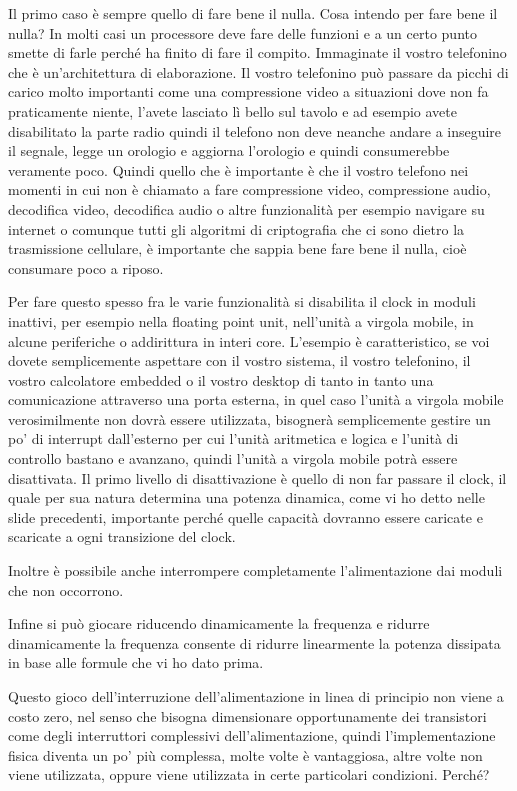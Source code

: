 Il primo caso è sempre quello di fare bene il nulla.
Cosa intendo per fare bene il nulla? In molti casi un processore deve fare delle funzioni e a un certo punto smette di farle perché ha finito di fare il compito. Immaginate il vostro telefonino che è un'architettura di elaborazione.
Il vostro telefonino può passare da picchi di carico molto importanti come una compressione video a situazioni dove non fa praticamente niente, l'avete lasciato lì bello sul tavolo e ad esempio avete disabilitato la parte radio quindi il telefono non deve neanche andare a inseguire il segnale, legge un orologio e aggiorna l'orologio e quindi consumerebbe veramente poco.
Quindi quello che è importante è che il vostro telefono nei momenti in cui non è chiamato a fare compressione video, compressione audio, decodifica video, decodifica audio o altre funzionalità per esempio navigare su internet o comunque tutti gli algoritmi di criptografia che ci sono dietro la trasmissione cellulare, è importante che sappia bene fare bene il nulla, cioè consumare poco a riposo.

Per fare questo spesso fra le varie funzionalità si disabilita il clock in moduli inattivi, per esempio nella floating point unit, nell'unità a virgola mobile, in alcune periferiche o addirittura in interi core.
L'esempio è caratteristico, se voi dovete semplicemente aspettare con il vostro sistema, il vostro telefonino, il vostro calcolatore embedded o il vostro desktop di tanto in tanto una comunicazione attraverso una porta esterna, in quel caso l'unità a virgola mobile verosimilmente non dovrà essere utilizzata, bisognerà semplicemente gestire un po' di interrupt dall'esterno per cui l'unità aritmetica e logica e l'unità di controllo bastano e avanzano, quindi l'unità a virgola mobile potrà essere disattivata.
Il primo livello di disattivazione è quello di non far passare il clock, il quale per sua natura determina una potenza dinamica, come vi ho detto nelle slide precedenti, importante perché quelle capacità dovranno essere caricate e scaricate a ogni transizione del clock.

Inoltre è possibile anche interrompere completamente l'alimentazione dai moduli che non occorrono.

Infine si può giocare riducendo dinamicamente la frequenza e ridurre dinamicamente la frequenza consente di ridurre linearmente la potenza dissipata in base alle formule che vi ho dato prima.

Questo gioco dell'interruzione dell'alimentazione in linea di principio non viene a costo zero, nel senso che bisogna dimensionare opportunamente dei transistori come degli interruttori complessivi dell'alimentazione, quindi l'implementazione fisica diventa un po' più complessa, molte volte è vantaggiosa, altre volte non viene utilizzata, oppure viene utilizzata in certe particolari condizioni.
Perché?


